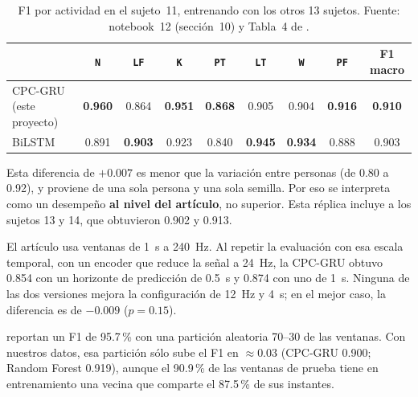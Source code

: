 \documentclass[letterpaper,11pt]{article}
\newcommand{\act}[1]{\texttt{#1}}
\begin{document}
\begin{table}[H]
  \centering
  \small
  \caption{F1 por actividad en el sujeto~11, entrenando con los otros 13 sujetos. Fuente: notebook~12 (sección~10) y Tabla~4 de \textcite{bassani2025}.}
  \label{tab:sujeto11}
  \setlength{\tabcolsep}{5pt}
  \begin{tabular}{lcccccccc}
    \toprule
    & \act{N} & \act{LF} & \act{K} & \act{PT} & \act{LT} & \act{W} & \act{PF} & F1 macro \\
    \midrule
    CPC-GRU (este proyecto) & \textbf{0.960} & 0.864 & \textbf{0.951} & \textbf{0.868} & 0.905 & 0.904 & \textbf{0.916} & \textbf{0.910} \\
    BiLSTM \parencite{bassani2025}          & 0.891 & \textbf{0.903} & 0.923 & 0.840 & \textbf{0.945} & \textbf{0.934} & 0.888 & 0.903 \\
    \bottomrule
  \end{tabular}
\end{table}

Esta diferencia de $+0.007$ es menor que la variación entre personas (de 0.80 a 0.92), y proviene de una sola persona y una sola semilla. Por eso se interpreta como un desempeño \textbf{al nivel del artículo}, no superior. Esta réplica incluye a los sujetos 13 y 14, que obtuvieron 0.902 y 0.913.

El artículo usa ventanas de 1~s a 240~Hz. Al repetir la evaluación con esa escala temporal, con un encoder que reduce la señal a 24~Hz, la CPC-GRU obtuvo 0.854 con un horizonte de predicción de 0.5~s y 0.874 con uno de 1~s. Ninguna de las dos versiones mejora la configuración de 12~Hz y 4~s; en el mejor caso, la diferencia es de $-0.009$ ($p = 0.15$).

\textcite{bassani2025} reportan un F1 de 95.7\,\% con una partición aleatoria 70--30 de las ventanas. Con nuestros datos, esa partición sólo sube el F1 en $\approx 0.03$ (CPC-GRU 0.900; Random Forest 0.919), aunque el 90.9\,\% de las ventanas de prueba tiene en entrenamiento una vecina que comparte el 87.5\,\% de sus instantes.
\end{document}
